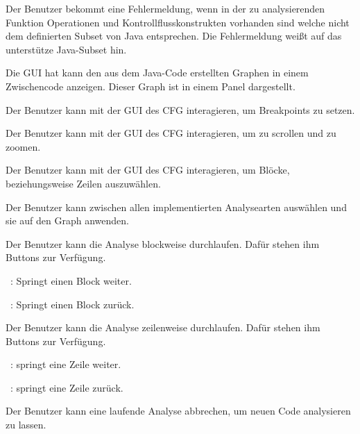 Der Benutzer bekommt eine Fehlermeldung, wenn in der zu analysierenden Funktion Operationen und Kontrollflusskonstrukten vorhanden sind welche nicht dem definierten Subset von Java entsprechen. Die Fehlermeldung weißt auf das unterstütze Java-Subset hin.

Die GUI hat kann den aus dem Java-Code erstellten Graphen in einem Zwischencode anzeigen. Dieser Graph ist in einem Panel dargestellt.

Der Benutzer kann mit der GUI des CFG interagieren, um Breakpoints zu setzen.

Der Benutzer kann mit der GUI des CFG interagieren, um zu scrollen und zu zoomen.

Der Benutzer kann mit der GUI des CFG interagieren, um Blöcke, beziehungsweise Zeilen auszuwählen.

Der Benutzer kann zwischen allen implementierten Analysearten auswählen und sie auf den Graph anwenden.

Der Benutzer kann die Analyse blockweise durchlaufen. Dafür stehen ihm Buttons zur Verfügung.\par
\faFastForward\ : Springt einen Block weiter.\par
\faFastBackward\ : Springt einen Block zurück.

Der Benutzer kann die Analyse zeilenweise durchlaufen. Dafür stehen ihm Buttons zur Verfügung.\par
\faForward\ : springt eine Zeile weiter.\par
\faBackward\ : springt eine Zeile zurück.

Der Benutzer kann eine laufende Analyse abbrechen, um neuen Code analysieren zu lassen.

